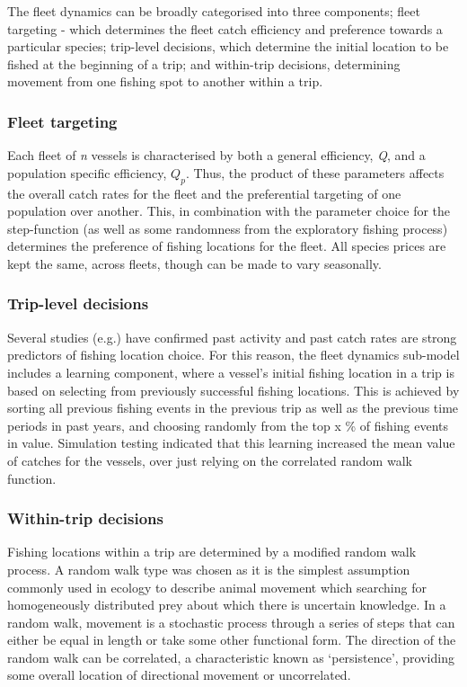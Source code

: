 \documentclass[review]{elsarticle}
\begin{document}
The fleet dynamics can be broadly categorised into three components; fleet
targeting - which determines the fleet catch efficiency and preference towards
a particular species; trip-level decisions, which determine the initial
location to be fished at the beginning of a trip; and within-trip decisions,
determining movement from one fishing spot to another within a trip.

\subsubsection{Fleet targeting}

Each fleet of \textit{n} vessels is characterised by both a general efficiency,
\textit{Q}, and a population specific efficiency, ${Q_{p}}$.  Thus, the product
of these parameters affects the overall catch rates for the fleet and the
preferential targeting of one population over another. This, in combination
with the parameter choice for the step-function (as well as some randomness
from the exploratory fishing process) determines the preference of fishing
locations for the fleet.  All species prices are kept the same, across fleets,
though can be made to vary seasonally.  

\subsubsection{Trip-level decisions}

Several studies (e.g.\cite{Hutton2004, Tidd2012, Girardin2015}) have confirmed
past activity and past catch rates are strong predictors of fishing location
choice. For this reason, the fleet dynamics sub-model includes a learning
component, where a vessel's initial fishing location in a trip is based on
selecting from previously successful fishing locations. This is achieved by
sorting all previous fishing events in the previous trip as well as the
previous time periods in past years, and choosing randomly from the top x \% of
fishing events in value.  Simulation testing indicated that this learning
increased the mean value of catches for the vessels, over just relying on the
correlated random walk function. 

\subsubsection{Within-trip decisions}

Fishing locations within a trip are determined by a modified random walk
process. A random walk type was chosen as it is the simplest assumption
commonly used in ecology to describe animal movement which searching for
homogeneously distributed prey about which there is uncertain knowledge. In a
random walk, movement is a stochastic process through a series of steps that
can either be equal in length or take some other functional form.  The
direction of the random walk can be correlated, a characteristic known as
`persistence', providing some overall location of directional movement
\cite{Codling2008} or uncorrelated. \\
\end{document}
